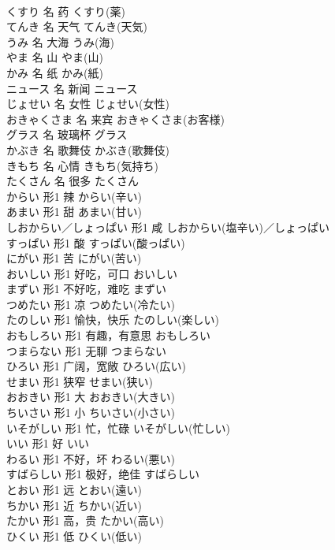 \documentclass[8pt]{extreport}
\begin{document}
\begin{CJK}{UTF8}{min}
\\	くすり	名	药	くすり(薬)	
\\	てんき	名	天气	てんき(天気)	
\\	うみ	名	大海	うみ(海)	
\\	やま	名	山	やま(山)	
\\	かみ	名	纸	かみ(紙)	
\\	ニュース	名	新闻	ニュース	
\\	じょせい	名	女性	じょせい(女性)	
\\	おきゃくさま	名	来宾	おきゃくさま(お客様)	
\\	グラス	名	玻璃杯	グラス	
\\	かぶき	名	歌舞伎	かぶき(歌舞伎)	
\\	きもち	名	心情	きもち(気持ち)	
\\	たくさん	名	很多	たくさん	
\\	からい	形1	辣	からい(辛い)	
\\	あまい	形1	甜	あまい(甘い)	
\\	しおからい／しょっぱい	形1	咸	しおからい(塩辛い)／しょっぱい	
\\	すっぱい	形1	酸	すっぱい(酸っぱい)	
\\	にがい	形1	苦	にがい(苦い)	
\\	おいしい	形1	好吃，可口	おいしい	
\\	まずい	形1	不好吃，难吃	まずい	
\\	つめたい	形1	凉	つめたい(冷たい)	
\\	たのしい	形1	愉快，快乐	たのしい(楽しい)	
\\	おもしろい	形1	有趣，有意思	おもしろい	
\\	つまらない	形1	无聊	つまらない	
\\	ひろい	形1	广阔，宽敞	ひろい(広い)	
\\	せまい	形1	狭窄	せまい(狭い)	
\\	おおきい	形1	大	おおきい(大きい)	
\\	ちいさい	形1	小	ちいさい(小さい)	
\\	いそがしい	形1	忙，忙碌	いそがしい(忙しい)	
\\	いい	形1	好	いい	
\\	わるい	形1	不好，坏	わるい(悪い)	
\\	すばらしい	形1	极好，绝佳	すばらしい	
\\	とおい	形1	远	とおい(遠い)	
\\	ちかい	形1	近	ちかい(近い)	
\\	たかい	形1	高，贵	たかい(高い)	
\\	ひくい	形1	低	ひくい(低い)	

\end{CJK}
\end{document}
